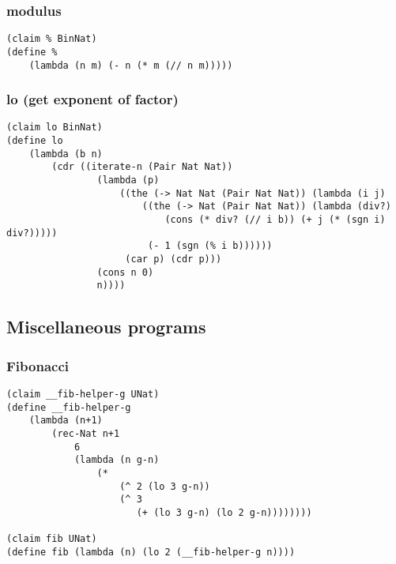 \subsubsection{modulus}
\begin{verbatim}
(claim % BinNat)
(define %
    (lambda (n m) (- n (* m (// n m)))))
\end{verbatim}

\subsubsection{lo (get exponent of factor)}
\begin{verbatim}
(claim lo BinNat)
(define lo
    (lambda (b n)
        (cdr ((iterate-n (Pair Nat Nat))
                (lambda (p)
                    ((the (-> Nat Nat (Pair Nat Nat)) (lambda (i j) 
                        ((the (-> Nat (Pair Nat Nat)) (lambda (div?) 
                            (cons (* div? (// i b)) (+ j (* (sgn i) div?)))))
                         (- 1 (sgn (% i b))))))
                     (car p) (cdr p)))
                (cons n 0)
                n))))
\end{verbatim}


\subsection{Miscellaneous programs}

\subsubsection{Fibonacci}
\begin{verbatim}
(claim __fib-helper-g UNat)
(define __fib-helper-g
    (lambda (n+1)
        (rec-Nat n+1
            6
            (lambda (n g-n) 
                (*
                    (^ 2 (lo 3 g-n))
                    (^ 3
                       (+ (lo 3 g-n) (lo 2 g-n))))))))

(claim fib UNat)
(define fib (lambda (n) (lo 2 (__fib-helper-g n))))
\end{verbatim}


